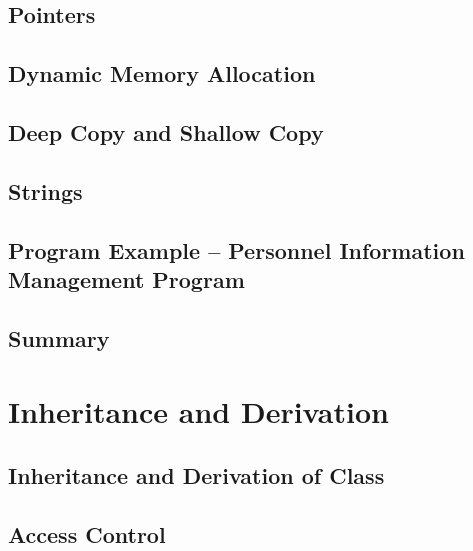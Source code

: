 \documentclass[a4paper]{article}
\begin{document}
\subsection{Pointers}

\subsection{Dynamic Memory Allocation}

\subsection{Deep Copy and Shallow Copy}

\subsection{Strings}

\subsection{Program Example – Personnel Information Management Program}

\subsection{Summary}

\newpage
\section{Inheritance and Derivation}
\subsection{Inheritance and Derivation of Class}

\subsection{Access Control}
\end{document}
